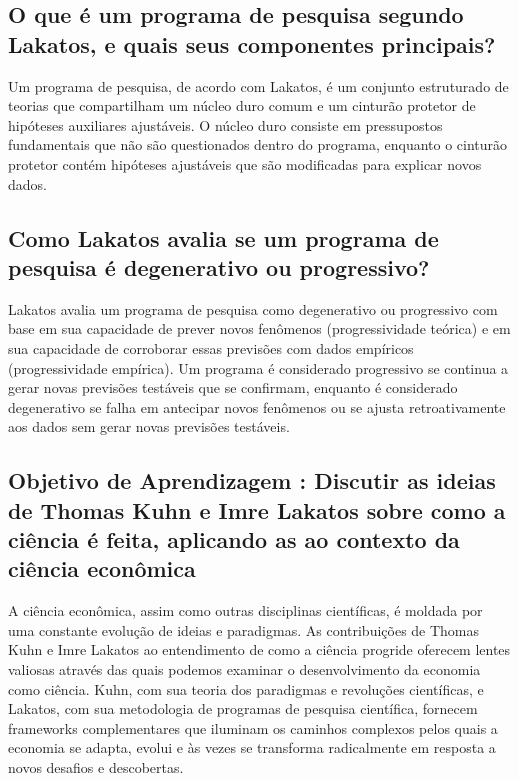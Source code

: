 \documentclass[a4paper,12pt]{article}[abntex2]
\begin{document}
\subsection{\textbf{O que é um programa de pesquisa segundo Lakatos, e quais seus componentes principais?}}
 Um programa de pesquisa, de acordo com Lakatos, é um conjunto estruturado de teorias que compartilham um núcleo duro comum e um cinturão protetor de hipóteses auxiliares ajustáveis. O núcleo duro consiste em pressupostos fundamentais que não são questionados dentro do programa, enquanto o cinturão protetor contém hipóteses ajustáveis que são modificadas para explicar novos dados.
\subsection{\textbf{Como Lakatos avalia se um programa de pesquisa é degenerativo ou progressivo?}}
 Lakatos avalia um programa de pesquisa como degenerativo ou progressivo com base em sua capacidade de prever novos fenômenos (progressividade teórica) e em sua capacidade de corroborar essas previsões com dados empíricos (progressividade empírica). Um programa é considerado progressivo se continua a gerar novas previsões testáveis que se confirmam, enquanto é considerado degenerativo se falha em antecipar novos fenômenos ou se ajusta retroativamente aos dados sem gerar novas previsões testáveis.
\subsection{\textbf{Objetivo de Aprendizagem : Discutir as ideias de Thomas Kuhn e Imre Lakatos sobre como a ciência é feita, aplicando as ao contexto da ciência econômica}}
A ciência econômica, assim como outras disciplinas científicas, é moldada por uma constante evolução de ideias e paradigmas. As contribuições de Thomas Kuhn e Imre Lakatos ao entendimento de como a ciência progride oferecem lentes valiosas através das quais podemos examinar o desenvolvimento da economia como ciência. Kuhn, com sua teoria dos paradigmas e revoluções científicas, e Lakatos, com sua metodologia de programas de pesquisa científica, fornecem frameworks complementares que iluminam os caminhos complexos pelos quais a economia se adapta, evolui e às vezes se transforma radicalmente em resposta a novos desafios e descobertas.
\end{document}
